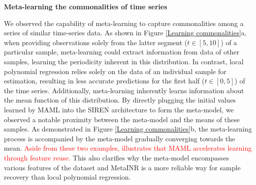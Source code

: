 \documentclass{article}
\begin{document}
\textbf{Meta-learning the commonalities of time series}

We observed the capability of meta-learning to capture commonalities among a series of similar time-series data.
As shown in Figure \ref{Learning commonalities}a, when providing observations solely from the latter segment ($t \in [5, 10]$) of a particular sample, 
meta-learning could extract information from data of other samples, learning the periodicity inherent in this distribution. 
In contrast, local polynomial regression relies solely on the data of an individual sample for estimation, 
resulting in less accurate predictions for the first half ($t \in [0, 5]$) of the time series.
Additionally, meta-learning inherently learns information about the mean function of this distribution. 
By directly plugging the initial values learned by MAML into the SIREN architecture to form the meta-model,
we observed a notable proximity between the meta-model and the means of these samples. 
As demonstrated in Figure \ref{Learning commonalities}b, the meta-learning process is accompanied by the meta-model gradually converging towards the mean.
\textcolor{red}{Aside from these two examples, \cite{raghu2019rapid}  illustrates that MAML accelerates learning through feature reuse.}
This also clarifies why the meta-model encompasses various features of the dataset and MetaINR is a more reliable way for sample recovery than local polynomial regression. 
\end{document}
